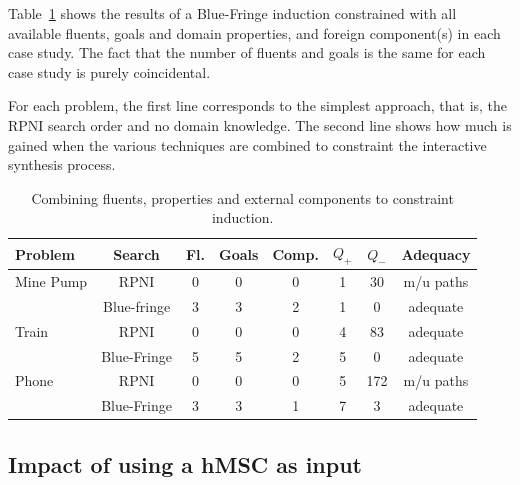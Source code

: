 Table~\ref{All:res} shows the results of a Blue-Fringe induction constrained with all available fluents, goals and domain properties, and foreign component(s) in each case study. The fact that the number of fluents and goals is the same for each case study is purely coincidental. 

For each problem, the first line corresponds to the simplest approach, that is, the RPNI search order and no domain knowledge. The second line shows how much is gained when the various techniques are combined to constraint the interactive synthesis process.

\begin{table}[H]
\centering
\begin{small}
\begin{tabular}{|l||c|c|c|c||c|c|c|}\hline
Problem   & Search      & Fl. & Goals & Comp. &$Q_+$&$Q_-$& Adequacy\\\hline\hline
Mine Pump & RPNI        & 0   & 0     & 0     & 1   & 30  & m/u paths\\\cline{2-8}
          & Blue-fringe & 3   & 3     & 2     & 1   & 0   & adequate\\\hline\hline
Train     & RPNI        & 0   & 0     & 0     & 4   & 83  & adequate\\\cline{2-8}
          & Blue-Fringe & 5   & 5     & 2     & 5   & 0   & adequate\\\hline\hline
Phone     & RPNI        & 0   & 0     & 0     & 5   & 172 & m/u paths\\\cline{2-8}
          & Blue-Fringe & 3   & 3     & 1     & 7   & 3   & adequate\\\hline
\end{tabular}
\end{small}
\caption{Combining fluents, properties and external components to constraint induction\label{All:res}.}
\end{table}


\subsection{Impact of using a hMSC as input}

